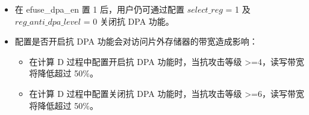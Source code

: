 \documentclass[main\_\_CN.tex]{subfiles}
\begin{document}
\begin{tiplisting}
\vspace{-2.5em}
\begin{itemize}
    \item 在 efuse\_dpa\_en 置 1 后，用户仍可通过配置 $select\_reg$ = 1 及 $reg\_anti\_dpa\_level$ = 0 关闭抗 DPA 功能。
    \item 配置是否开启抗 DPA 功能会对访问片外存储器的带宽造成影响：
        \begin{itemize}
            \item 在计算 D 过程中配置开启抗 DPA 功能时，当抗攻击等级 >=4，读写带宽将降低超过 50\%。
            \item 在计算 D 过程中配置关闭抗 DPA 功能时，当抗攻击等级 >=6，读写带宽将降低超过 50\%。
        \end{itemize}
\end{itemize}


\end{tiplisting}
\end{document}
